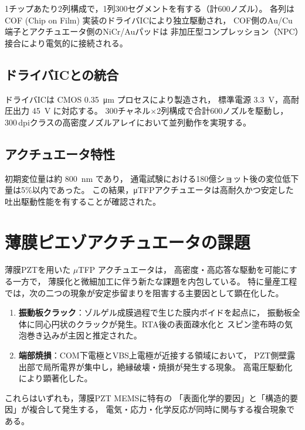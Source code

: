 \documentclass[conference]{IEEEtran}
\begin{document}
1チップあたり2列構成で，1列300セグメントを有する（計600ノズル）。
各列はCOF (Chip on Film) 実装のドライバICにより独立駆動され，
COF側のAu/Cu端子とアクチュエータ側のNiCr/Auパッドは
非加圧型コンプレッション（NPC）接合により電気的に接続される。

\subsection{ドライバICとの統合}
ドライバICは CMOS \SI{0.35}{\micro\metre} プロセスにより製造され，
標準電源 \SI{3.3}{V}，高耐圧出力 \SI{45}{V} に対応する。
300チャネル×2列構成で合計600ノズルを駆動し，
300\,dpiクラスの高密度ノズルアレイにおいて並列動作を実現する。

\subsection{アクチュエータ特性}
初期変位量は約 \SI{800}{nm} であり，
通電試験における180億ショット後の変位低下量は5\%以内であった。
この結果，μTFPアクチュエータは高耐久かつ安定した吐出駆動性能を有することが確認された。

\section{薄膜ピエゾアクチュエータの課題}
薄膜PZTを用いた $\mu$TFP アクチュエータは，
高密度・高応答な駆動を可能にする一方で，
薄膜化と微細加工に伴う新たな課題を内包している。
特に量産工程では，次の二つの現象が安定歩留まりを阻害する主要因として顕在化した。

\begin{enumerate}
  \item \textbf{振動板クラック}：ゾルゲル成膜過程で生じた膜内ボイドを起点に，
  振動板全体に同心円状のクラックが発生。RTA後の表面疎水化と
  スピン塗布時の気泡巻き込みが主因と推定された。
  \item \textbf{端部焼損}：COM下電極とVBS上電極が近接する領域において，
  PZT側壁露出部で局所電界が集中し，絶縁破壊・焼損が発生する現象。
  高電圧駆動化により顕著化した。
\end{enumerate}

これらはいずれも，薄膜PZT MEMSに特有の
「表面化学的要因」と「構造的要因」が複合して発生する，
電気・応力・化学反応が同時に関与する複合現象である。

\end{document}
